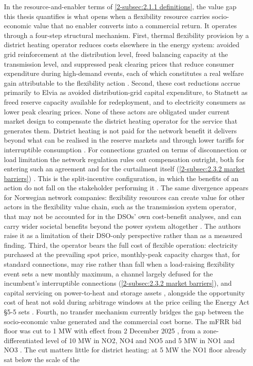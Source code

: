In the resource-and-enabler terms of \autoref{2-subsec:2.1.1 definitions}, the value gap this thesis quantifies is what opens when a flexibility resource carries socio-economic value that no enabler converts into a commercial return. It operates through a four-step structural mechanism. First, thermal flexibility provision by a district heating operator reduces costs elsewhere in the energy system: avoided grid reinforcement at the distribution level, freed balancing capacity at the transmission level, and suppressed peak clearing prices that reduce consumer expenditure during high-demand events, each of which constitutes a real welfare gain attributable to the flexibility action \cite{Thema_fjernvarme_2024, mitridati_heat_2020, mitridati_power_2018}. Second, these cost reductions accrue primarily to Elvia as avoided distribution-grid capital expenditure, to Statnett as freed reserve capacity available for redeployment, and to electricity consumers as lower peak clearing prices. None of these actors are obligated under current market design to compensate the district heating operator for the service that generates them. District heating is not paid for the network benefit it delivers beyond what can be realised in the reserve markets and through lower tariffs for interruptible consumption \cite{Thema_fjernvarme_2024}. For connections granted on terms of disconnection or load limitation the network regulation rules out compensation outright, both for entering such an agreement and for the curtailment itself (\autoref{2-subsec:2.3.2 market barriers}) \cite{energidepartementet_forskrift_2019}. This is the split-incentive configuration, in which the benefits of an action do not fall on the stakeholder performing it \cite{sneum_barriers_2021}. The same divergence appears for Norwegian network companies: flexibility resources can create value for other actors in the flexibility value chain, such as the transmission system operator, that may not be accounted for in the DSOs' own cost-benefit analyses, and can carry wider societal benefits beyond the power system altogether \cite{saele_understanding_2023}. The authors raise it as a limitation of their DSO-only perspective rather than as a measured finding. Third, the operator bears the full cost of flexible operation: electricity purchased at the prevailing spot price, monthly-peak capacity charges that, for standard connections, may rise rather than fall when a load-raising flexibility event sets a new monthly maximum, a channel largely defused for the incumbent's interruptible connections (\autoref{2-subsec:2.3.2 market barriers}), and capital servicing on power-to-heat and storage assets \cite{kirkerud_impacts_2016, djorup_district_2020}, alongside the opportunity cost of heat not sold during arbitrage windows at the price ceiling the Energy Act §5-5 sets \cite{energidepartementet_lov_1991}. Fourth, no transfer mechanism currently bridges the gap between the socio-economic value generated and the commercial cost borne. The mFRR bid floor was cut to 1 MW with effect from 2 December 2025 \cite{statnett_1_2025}, from a zone-differentiated level of 10 MW in NO2, NO4 and NO5 and 5 MW in NO1 and NO3 \cite{dalen_fleksibilitet_nodate}. The cut matters little for district heating: at 5 MW the NO1 floor already sat below the scale of the 